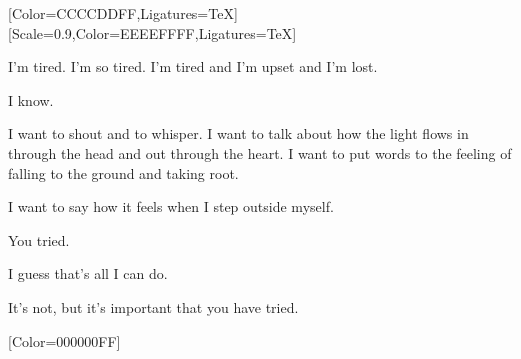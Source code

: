 \begin{paracol}{2}
  \begin{leftcolumn}

    [Color=CCCCDDFF,Ligatures=TeX]
    \renewfontfamily{}[Scale=0.9,Color=EEEEFFFF,Ligatures=TeX]
    \null

\noindent I'm tired. I'm so tired. I'm tired and I'm upset and I'm lost.

\begin{ally}
I know.
\end{ally}
I want to shout and to whisper. I want to talk about how the light flows in through the head and out through the heart. I want to put words to the feeling of falling to the ground and taking root.

I want to say how it feels when I step outside myself.

\begin{ally}
You tried.
\end{ally}
I guess that's all I can do.

\begin{ally}
It's not, but it's important that you have tried.
\end{ally}
\newpage
\end{leftcolumn}
\end{paracol}
\resetbackgroundcolor

\renewfontfamily{}[Color=000000FF]
